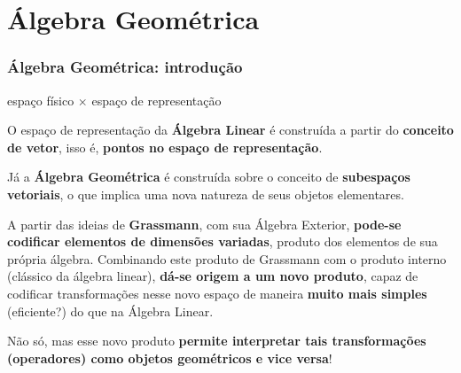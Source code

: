 \documentclass[10pt]{beamer}
\theoremstyle{plain}
\theoremstyle{definition}
\begin{document}
	\section{Álgebra Geométrica}
	\begin{frame}
		\frametitle{Álgebra Geométrica: introdução}
		\begin{center}
			espaço físico $\times$ espaço de representação
		\end{center}
		O espaço de representação da \textbf{Álgebra Linear} é construída a partir do \textbf{conceito de vetor}, isso é, \textbf{pontos no espaço de representação}. 
		
		Já a \textbf{Álgebra Geométrica} é construída sobre o conceito de \textbf{subespaços vetoriais}, o que implica uma nova natureza de seus objetos elementares.
		\vspace{0.5cm}
		
		A partir das ideias de \textbf{Grassmann}, com sua Álgebra Exterior, \textbf{pode-se codificar elementos de dimensões variadas}, produto dos elementos de sua própria álgebra. Combinando este produto de Grassmann com o produto interno (clássico da álgebra linear), \textbf{dá-se origem a um novo produto}, capaz de codificar transformações nesse novo espaço de maneira \textbf{muito mais simples} (eficiente?) do que na Álgebra Linear. 
		
		Não só, mas esse novo produto \textbf{permite interpretar tais transformações (operadores) como objetos geométricos e vice versa}!
	\end{frame}
\end{document}
